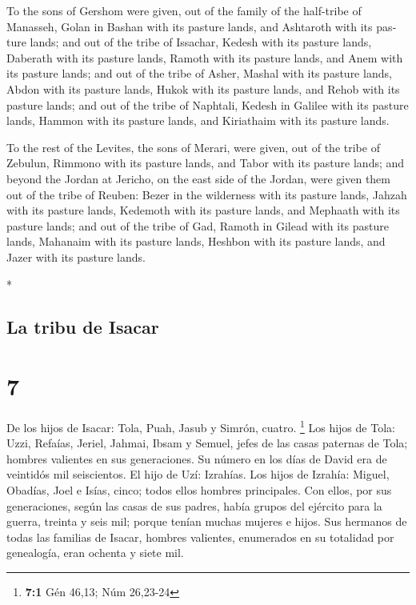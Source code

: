 \begin{paracol}{2}
\begin{otherlanguage}{english}
 To the sons of Gershom were given, out of the family of
the half-tribe of Manasseh, Golan in Bashan with its pasture lands, and
Ashtaroth with its pasture lands;  and out of the tribe
of Issachar, Kedesh with its pasture lands, Daberath with its pasture
lands,  Ramoth with its pasture lands, and Anem with its
pasture lands;  and out of the tribe of Asher, Mashal
with its pasture lands, Abdon with its pasture lands, 
Hukok with its pasture lands, and Rehob with its pasture lands;
 and out of the tribe of Naphtali, Kedesh in Galilee with
its pasture lands, Hammon with its pasture lands, and Kiriathaim with
its pasture lands.

 To the rest of the Levites, the sons of Merari, were
given, out of the tribe of Zebulun, Rimmono with its pasture lands, and
Tabor with its pasture lands;  and beyond the Jordan at
Jericho, on the east side of the Jordan, were given them out of the
tribe of Reuben: Bezer in the wilderness with its pasture lands, Jahzah
with its pasture lands,  Kedemoth with its pasture lands,
and Mephaath with its pasture lands;  and out of the
tribe of Gad, Ramoth in Gilead with its pasture lands, Mahanaim with its
pasture lands,  Heshbon with its pasture lands, and Jazer
with its pasture lands.

\end{otherlanguage}

\switchcolumn[0]*

\hypertarget{la-tribu-de-isacar}{%
\subsection{La tribu de Isacar}\label{la-tribu-de-isacar}}

\hypertarget{section-12}{%
\section{7}\label{section-12}}

 De los hijos de Isacar: Tola, Puah, Jasub y Simrón,
cuatro. \footnote{\textbf{7:1} Gén 46,13; Núm 26,23-24} 
Los hijos de Tola: Uzzi, Refaías, Jeriel, Jahmai, Ibsam y Semuel, jefes
de las casas paternas de Tola; hombres valientes en sus generaciones. Su
número en los días de David era de veintidós mil seiscientos.
 El hijo de Uzí: Izrahías. Los hijos de Izrahía: Miguel,
Obadías, Joel e Isías, cinco; todos ellos hombres principales.
 Con ellos, por sus generaciones, según las casas de sus
padres, había grupos del ejército para la guerra, treinta y seis mil;
porque tenían muchas mujeres e hijos.  Sus hermanos de
todas las familias de Isacar, hombres valientes, enumerados en su
totalidad por genealogía, eran ochenta y siete mil.


\end{paracol}
